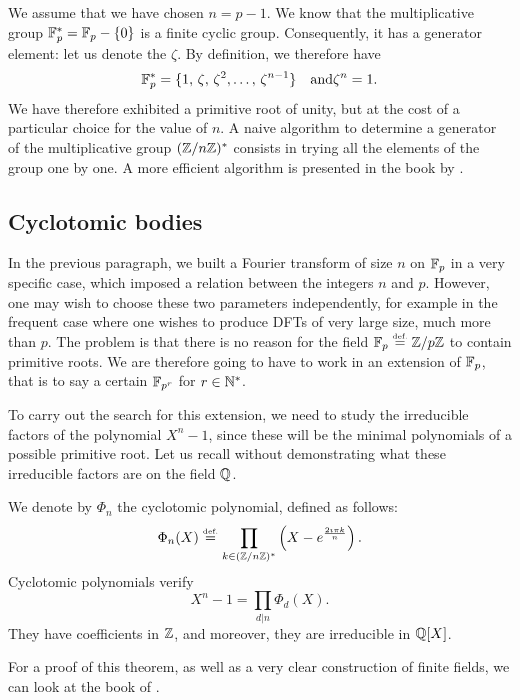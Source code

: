  
We assume that we have chosen $ n = p-1 $. We know that the multiplicative group $ \mathbb{F}_p^* = \mathbb{F}_p - \{0\} $ is a finite cyclic group. Consequently, it has a generator element: let us denote the $ \zeta $. By definition, we therefore have
\begin{equation*}
\mathbb{F}_p^* = \{1, \, \zeta, \, \zeta^2, \ldots, \, \zeta^{n-1}\} \quad \text{and} \zeta^n = 1.
\end{equation*}
We have therefore exhibited a primitive  root of unity, but at the cost of a particular choice for the value of $ n $. A naive algorithm to determine a generator of the multiplicative group $ (\mathbb{Z}/n \mathbb{Z})^* $ consists in trying all the elements of the group one by one. A more efficient algorithm is presented in the book by  \cite{cohen-computational}.
\subsection{Cyclotomic bodies}
\label{sect2-cyclotomic-field}
 
 
In the previous paragraph, we built a Fourier transform of size $ n $ on $ \mathbb{F}_p $ in a very specific case, which imposed a relation between the integers $ n $ and $ p $. However, one may wish to choose these two parameters independently, for example in the frequent case where one wishes to produce DFTs of very large size, much more than $ p $. The problem is that there is no reason for the field $ \mathbb{F}_p \stackrel{\mbox{\upshape\tiny def.}}{=} \mathbb{Z}/p \mathbb{Z} $ to contain primitive  roots. We are therefore going to have to work in an extension of $ \mathbb{F}_p $, that is to say a certain $ \mathbb{F}_{p^r} $ for $ r \in \mathbb{N}^* $.
 
 
To carry out the search for this extension, we need to study the irreducible factors of the polynomial $ X^n-1 $, since these will be the minimal polynomials of a possible primitive root. Let us recall without demonstrating what these irreducible factors are on the field $ \mathbb{Q} $.
 
\begin{thmdefn}
 
 \label{notation-64} We denote by $ \Phi_n $ the  cyclotomic polynomial, defined as follows:
\begin{equation*}
\Phi_n (X) \stackrel{\mbox{\upshape\tiny def.}}{=} \prod_{k \in (\mathbb{Z}/n \mathbb{Z})^*} \left(X- e^{\frac{2 \imath \pi k}{n}} \right).
\end{equation*}
Cyclotomic polynomials verify
\begin{equation}
\label{eq-decomposition-xn-1}
X^n-1 = \prod_{d | n}{\Phi_d (X)}.
\end{equation}
They have coefficients in $ \mathbb{Z} $, and moreover, they are irreducible in $ \mathbb{Q} [X] $.
\end{thmdefn}
For a proof of this theorem, as well as a very clear construction of finite fields, we can look at the book of  \cite{demazure}.
 
